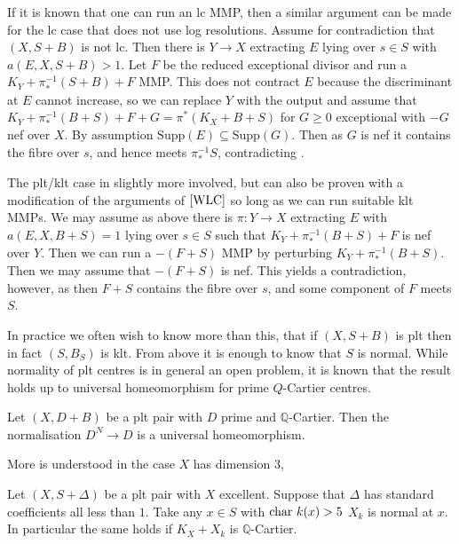 \begin{remark}\label{no-res}
	
	If it is known that one can run an lc MMP, then a similar argument can be made for the lc case that does not use log resolutions. Assume for contradiction that $(X,S+B)$ is not lc. Then there is $Y \to X$ extracting $E$ lying over $s \in S$ with $a(E,X,S+B)> 1$. Let $F$ be the reduced exceptional divisor and run a $K_{Y}+\pi_{*}^{-1}(S+B)+F$ MMP. This does not contract $E$ because the discriminant at $E$ cannot increase, so we can replace $Y$ with the output and assume that $K_{Y}+\pi_{*}^{-1}(B+S)+F+G=\pi^{*}(K_{X}+B+S)$ for $G\geq0$ exceptional with $-G$ nef over $X$. By assumption $\text{Supp}(E) \subseteq \text{Supp}(G)$. Then as $G$ is nef it contains the fibre over $s$, and hence meets $\pi_{*}^{-1}S$, contradicting \cite[Claim 4.7.3]{kk-singbook}.
	
	The plt/klt case in slightly more involved, but can also be proven with a modification of the arguments of $\autoref{WLC}$ so long as we can run suitable klt MMPs. We may assume as above there is $\pi \colon Y \to X$ extracting $E$ with $a(E,X,B+S)=1$ lying over $s \in S$ such that $K_{Y}+\pi_{*}^{-1}(B+S)+F$ is nef over $Y$. Then we can run a $-(F+S)$ MMP by perturbing $K_{Y}+\pi_{*}^{-1}(B+S)$. Then we may assume that $-(F+S)$ is nef. This yields a contradiction, however, as then $F+S$ contains the fibre over $s$, and some component of $F$ meets $S$.
	\end{remark}

In practice we often wish to know more than this, that if $(X,S+B)$ is plt then in fact $(S,B_{S})$ is klt. From above it is enough to know that $S$ is normal. While normality of plt centres is in general an open problem, it is known that the result holds up to universal homeomorphism for prime $Q$-Cartier centres.

\begin{lemma}\cite[Lemma 2.1]{hacon2020relative}\label{plt-universal}
	
	Let $(X,D+B)$ be a plt pair with $D$ prime and $\mathbb{Q}$-Cartier. Then the normalisation $D^{N} \to D$ is a universal homeomorphism.
	
	\end{lemma}

More is understood in the case $X$ has dimension $3$,

\begin{theorem}\cite[Corollary 7.17]{bhatt2020}\label{plt-adj}
		Let $(X,S+\Delta)$ be a plt pair with $X$ excellent. Suppose that $\Delta$ has standard coefficients all less than $1$. Take any $x \in S$ with $\textup{char } k(x) > 5$ $X_{k}$ is normal at $x$. In particular the same holds if $K_{X}+X_{k}$ is $\mathbb{Q}$-Cartier.
\end{theorem}

